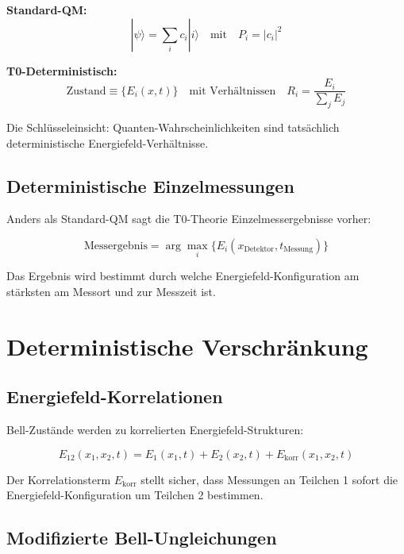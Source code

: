\documentclass[12pt,a4paper]{report}
\begin{document}
	\textbf{Standard-QM:}
	\begin{equation}
		|\psi\rangle = \sum_i c_i |i\rangle \quad \text{mit} \quad P_i = |c_i|^2
	\end{equation}
	
	\textbf{T0-Deterministisch:}
	\begin{equation}
		\text{Zustand} \equiv \{E_i(x,t)\} \quad \text{mit Verhältnissen} \quad R_i = \frac{E_i}{\sum_j E_j}
	\end{equation}
	
	Die Schlüsseleinsicht: Quanten-Wahrscheinlichkeiten sind tatsächlich deterministische Energiefeld-Verhältnisse.
	
	\subsection{Deterministische Einzelmessungen}
	\label{subsec:deterministic_measurements}
	
	Anders als Standard-QM sagt die T0-Theorie Einzelmessergebnisse vorher:
	
	\begin{equation}
		\text{Messergebnis} = \arg\max_i\{E_i(x_{\text{Detektor}}, t_{\text{Messung}})\}
	\end{equation}
	
	Das Ergebnis wird bestimmt durch welche Energiefeld-Konfiguration am stärksten am Messort und zur Messzeit ist.
	
	\section{Deterministische Verschränkung}
	\label{sec:deterministic_entanglement}
	
	\subsection{Energiefeld-Korrelationen}
	\label{subsec:energy_field_correlations}
	
	Bell-Zustände werden zu korrelierten Energiefeld-Strukturen:
	
	\begin{equation}
		E_{12}(x_1,x_2,t) = E_1(x_1,t) + E_2(x_2,t) + E_{\text{korr}}(x_1,x_2,t)
	\end{equation}
	
	Der Korrelationsterm $E_{\text{korr}}$ stellt sicher, dass Messungen an Teilchen 1 sofort die Energiefeld-Konfiguration um Teilchen 2 bestimmen.
	
	\subsection{Modifizierte Bell-Ungleichungen}
	\label{subsec:modified_bell_inequalities}
	
\end{document}

